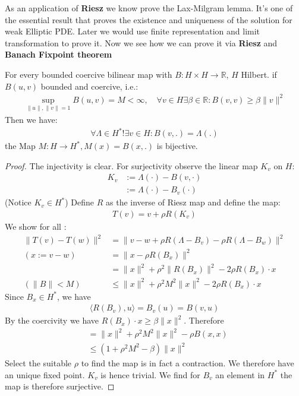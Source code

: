 As an application of \textbf{Riesz} we know prove the Lax-Milgram lemma. It's one of the essential result that proves the existence and uniqueness of the solution for weak Elliptic PDE. Later we would use finite representation and limit transformation to prove it. Now we see how we can prove it via \textbf{Riesz} and \textbf{Banach Fixpoint theorem}
\begin{corollary}
	For every bounded coercive bilinear map with $B: H\times H \rightarrow \mathbb{R}$, $H$ Hilbert. if $B(u, v)$ bounded and coercive, i.e.:
	\begin{align*}
		\sup_{\|u\|, \|v\| = 1} B(u, v) = M < \infty, \quad \forall v \in H \exists \beta \in \mathbb{R}: B(v, v) \ge \beta\|v\|^2
	\end{align*}
	Then we have:
	\begin{align*}
		\forall \Lambda \in H^* !\exists v \in H: B(v, .) = \Lambda(.)
	\end{align*}
	the Map $M: H \rightarrow H^*, M(x) = B(x, .)$ is bijective. 
\end{corollary}
\begin{proof}
 	The injectivity is clear. For surjectivity observe the linear map $K_v$ on $H$:
	\begin{align*}
		K_v &:= \Lambda(\cdot) - B(v, \cdot) \\
		&:= \Lambda(\cdot) - B_v(\cdot)
	\end{align*}
	(Notice $K_v\in H^*$)
	Define $R$ as the inverse of Riesz map and define the map:
	\begin{align*}
		T(v) = v + \rho R(K_v)
	\end{align*}
	We show for all :
	\begin{align*}
		\|T(v) - T(w)\|^2 &= \|v - w + \rho R(\Lambda - B_v) - \rho R(\Lambda - B_w)   \|^2\\		
		(x:= v - w)
		&=\|x - \rho R(B_x)\|^2   \\
		&= \|x\|^2 + \rho^2 \|R(B_x)\|^2 - 2\rho R(B_x)\cdot x\\
		(\|B\|< M)
		&\le \|x\|^2 + \rho^2 M^2\|x\|^2 - 2\rho R(B_x) \cdot x
	\end{align*} 
	Since $B_x \in H^*$, we have 
	\begin{align*}
		\langle R(B_v), u \rangle  = B_v(u) = B(v, u)
	\end{align*} 
	By the coercivity we have $R(B_x)\cdot x \ge \beta \|x\|^2$. Therefore
	\begin{align*}
		&= \|x\|^2 + \rho^2 M^2\|x\|^2 - \rho B(x, x)\\
		&\le (1 + \rho^2M^2 - \beta) \|x\|^2
	\end{align*}
	Select the suitable $\rho$ to find the map is in fact a contraction. We therefore have an unique fixed point. $K_v$ is hence trivial. We find for $B_v$ an element in $H^*$ the map is therefore surjective. 
\end{proof}


